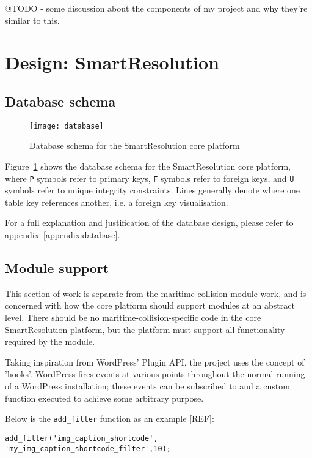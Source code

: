 @TODO - some discussion about the components of my project and why they're similar to this.

\section{Design: SmartResolution}

\subsection{Database schema}

\begin{figure}[h!]
  \centering
    \texttt{[image: database]}
  \caption{Database schema for the SmartResolution core platform}
  \label{uml:databaseSchema}
\end{figure}

Figure~\ref{uml:databaseSchema} shows the database schema for the SmartResolution core platform, where \lstinline{P} symbols refer to primary keys, \lstinline{F} symbols refer to foreign keys, and \lstinline{U} symbols refer to unique integrity constraints. Lines generally denote where one table key references another, i.e. a foreign key visualisation.

For a full explanation and justification of the database design, please refer to appendix~\ref{appendix:database}.

\subsection{Module support}

This section of work is separate from the maritime collision module work, and is concerned with how the core platform should support modules at an abstract level. There should be no maritime-collision-specific code in the core SmartResolution platform, but the platform must support all functionality required by the module.

Taking inspiration from WordPress' Plugin API, the project uses the concept of 'hooks'. WordPress fires events at various points throughout the normal running of a WordPress installation; these events can be subscribed to and a custom function executed to achieve some arbitrary purpose.

Below is the \lstinline{add_filter} function as an example [REF]: %

\begin{lstlisting}
add_filter('img_caption_shortcode', 'my_img_caption_shortcode_filter',10);
\end{lstlisting}

